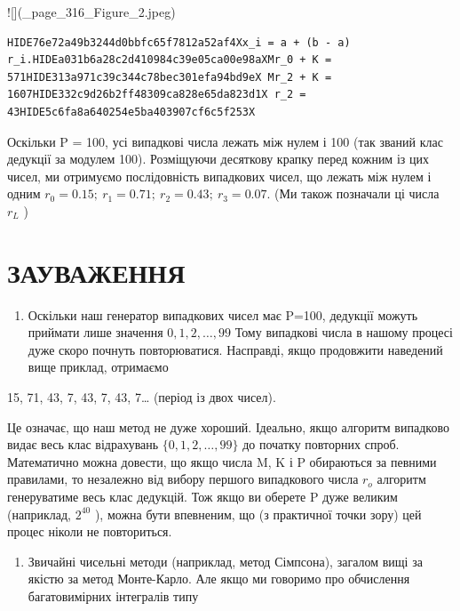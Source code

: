 \documentclass[
  ukrainian,
]{article}
\providecommand{\tightlist}{%
  \setlength{\itemsep}{0pt}\setlength{\parskip}{0pt}}
\begin{document}
![](\_page\_316\_Figure\_2.jpeg)

\begin{verbatim}
HIDE76e72a49b3244d0bbfc65f7812a52af4Xx_i = a + (b - a) r_i.HIDEa031b6a28c2d410984c39e05ca00e98aXMr_0 + K = 571HIDE313a971c39c344c78bec301efa94bd9eX Mr_2 + K = 1607HIDE332c9d26b2ff48309ca828e65da823d1X r_2 = 43HIDE5c6fa8a640254e5ba403907cf6c5f253X
\end{verbatim}

Оскільки P = 100, усі випадкові числа лежать між нулем і 100 (так званий
клас дедукції за модулем 100). Розміщуючи десяткову крапку перед кожним
із цих чисел, ми отримуємо послідовність випадкових чисел, що лежать між
нулем і одним \(r_0=0.15;\ r_1=0.71;\ r_2=0.43;\ r_3=0.07.\) (Ми також
позначали ці числа \(r_L\) )

\section{ЗАУВАЖЕННЯ}\label{ux437ux430ux443ux432ux430ux436ux435ux43dux43dux44f-10}

\begin{enumerate}
\def\labelenumi{\arabic{enumi}.}
\tightlist
\item
  Оскільки наш генератор випадкових чисел має P=100, дедукції можуть
  приймати лише значення \(0,1,2,\ldots,99\) Тому випадкові числа в
  нашому процесі дуже скоро почнуть повторюватися. Насправді, якщо
  продовжити наведений вище приклад, отримаємо
\end{enumerate}

15, 71, 43, 7, 43, 7, 43, 7\ldots{} (період із двох чисел).

Це означає, що наш метод не дуже хороший. Ідеально, якщо алгоритм
випадково видає весь клас відрахувань \(\{0, 1, 2, \ldots, 99\}\) до
початку повторних спроб. Математично можна довести, що якщо числа M, K і
P обираються за певними правилами, то незалежно від вибору першого
випадкового числа \(r_o\) алгоритм генеруватиме весь клас дедукцій. Тож
якщо ви оберете P дуже великим (наприклад, \(2^{40}\) ), можна бути
впевненим, що (з практичної точки зору) цей процес ніколи не
повториться.

\begin{enumerate}
\def\labelenumi{\arabic{enumi}.}
\setcounter{enumi}{1}
\tightlist
\item
  Звичайні чисельні методи (наприклад, метод Сімпсона), загалом вищі за
  якістю за метод Монте-Карло. Але якщо ми говоримо про обчислення
  багатовимірних інтегралів типу
\end{enumerate}
\end{document}
